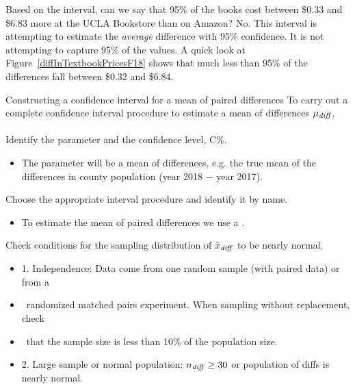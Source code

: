\begin{examplewrap}
\begin{nexample}
{Based on the interval, can we say that 95\% of the books cost between \$0.33 and \$6.83 more at the UCLA Bookstore than on Amazon? }No.  This interval is attempting to estimate the \emph{average} difference with 95\% confidence.  It is not attempting to capture 95\% of the values.  A quick look at Figure~\ref{diffInTextbookPricesF18} shows that much less than 95\% of the differences fall between \$0.32 and \$6.84.


\end{nexample}
\end{examplewrap}


\begin{onebox}{Constructing a confidence interval for a mean of paired differences}
To carry out a complete confidence interval procedure to estimate a mean of differences $\mu_{\text{\emph{diff}}}$,
\\
\\
 Identify the parameter and the confidence level, C\%.\vspace{-1mm}
\begin{itemize} 
\item[] The parameter will be a mean of differences, e.g. the true mean of the differences in county population (year 2018 $-$ year 2017).  
\end{itemize}
 Choose the appropriate interval procedure and identify it by name. \vspace{-1mm}
\begin{itemize}
\item[] To estimate the mean of paired differences we use a .
\end{itemize}
 Check conditions for the sampling distribution of $\bar{x}_{\text{\emph{diff}}}$ to be nearly normal.\vspace{-1mm}
\begin{itemize}
\setlength{\itemsep}{0mm}
\item[] 1. Independence:  Data come from one random sample (with paired data) or from a 
\item[] \ \quad randomized matched pairs experiment.  When sampling without replacement, check 
\item[] \ \quad that the sample size is less than 10\% of the population size.
\item[] 2. Large sample or normal population:  $n_{\text{\emph{diff}}}\ge 30$ or population of diffs is nearly normal.

\end{itemize}
\end{onebox}
